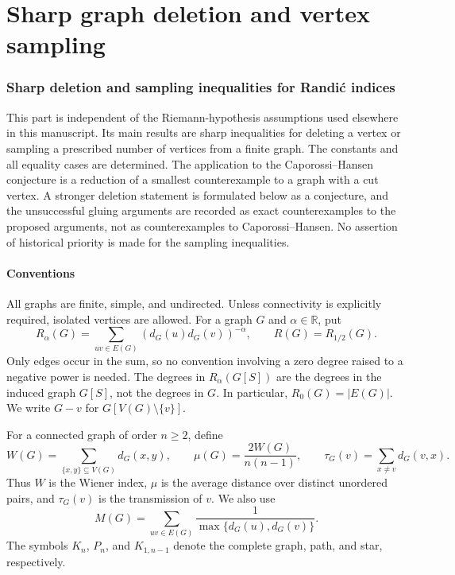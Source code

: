 \documentclass[11pt,a4paper]{article}
\theoremstyle{definition}
\theoremstyle{remark}
\begin{document}
\clearpage
\part{Sharp graph deletion and vertex sampling}\label{r-part-graph}

\section{Sharp deletion and sampling inequalities for Randi\'c indices}
\label{g-sec-main}

This part is independent of the Riemann-hypothesis assumptions used elsewhere
in this manuscript.  Its main results are sharp inequalities for deleting a
vertex or sampling a prescribed number of vertices from a finite graph.  The
constants and all equality cases are determined.  The application to the
Caporossi--Hansen conjecture is a reduction of a smallest counterexample to a
graph with a cut vertex.  A stronger deletion statement is formulated below
as a conjecture, and the unsuccessful gluing arguments are recorded as exact
counterexamples to the proposed arguments, not as counterexamples to
Caporossi--Hansen.  No assertion of historical priority is made for the
sampling inequalities.

\subsection{Conventions}
\label{g-sub-conventions}

All graphs are finite, simple, and undirected.  Unless connectivity is
explicitly required, isolated vertices are allowed.  For a graph $G$ and
$\alpha\in\mathbb R$, put
\[
 R_\alpha(G)=\sum_{uv\in E(G)}(d_G(u)d_G(v))^{-\alpha},
 \qquad R(G)=R_{1/2}(G).
\]
Only edges occur in the sum, so no convention involving a zero degree raised
to a negative power is needed.  The degrees in $R_\alpha(G[S])$ are the
degrees in the induced graph $G[S]$, not the degrees in $G$.  In particular,
$R_0(G)=|E(G)|$.  We write $G-v$ for $G[V(G)\setminus\{v\}]$.

For a connected graph of order $n\ge2$, define
\[
 W(G)=\sum_{\{x,y\}\subseteq V(G)}d_G(x,y),\qquad
 \mu(G)=\frac{2W(G)}{n(n-1)},\qquad
 \tau_G(v)=\sum_{x\ne v}d_G(v,x).
\]
Thus $W$ is the Wiener index, $\mu$ is the average distance over distinct
unordered pairs, and $\tau_G(v)$ is the transmission of $v$.  We also use
\[
 M(G)=\sum_{uv\in E(G)}\frac1{\max\{d_G(u),d_G(v)\}}.
\]
The symbols $K_n$, $P_n$, and $K_{1,n-1}$ denote the complete graph, path,
and star, respectively.
\end{document}
